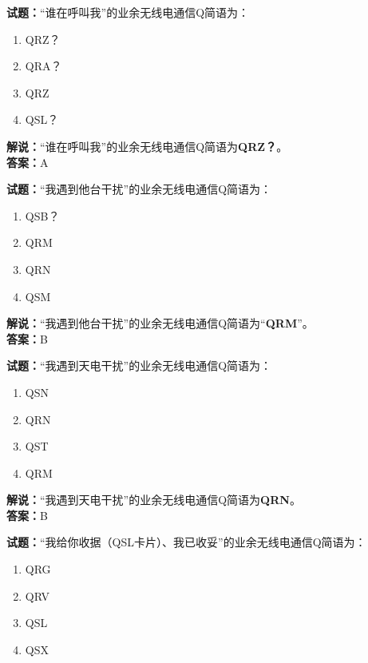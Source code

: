 \documentclass{ctexbook}
\begin{document}
\bigskip


\noindent\textbf{试题：}“谁在呼叫我”的业余无线电通信Q简语为：

\begin{enumerate}[leftmargin=3em]
	\item QRZ？
	\item QRA？
	\item QRZ
	\item QSL？
\end{enumerate}

\noindent\textbf{解说：}“谁在呼叫我”的业余无线电通信Q简语为\textbf{QRZ？}。\\\noindent\textbf{答案：}A


\bigskip


\noindent\textbf{试题：}“我遇到他台干扰”的业余无线电通信Q简语为：

\begin{enumerate}[leftmargin=3em]
	\item QSB？
	\item QRM
	\item QRN
	\item QSM
\end{enumerate}
\noindent\textbf{解说：}“我遇到他台干扰”的业余无线电通信Q简语为“\textbf{QRM}”。\\\noindent\textbf{答案：}B


\bigskip


\noindent\textbf{试题：}“我遇到天电干扰”的业余无线电通信Q简语为：

\begin{enumerate}[leftmargin=3em]
	\item QSN
	\item QRN
	\item QST
	\item QRM
\end{enumerate}

\noindent\textbf{解说：}“我遇到天电干扰”的业余无线电通信Q简语为\textbf{QRN}。\\\noindent\textbf{答案：}B


\bigskip


\noindent\textbf{试题：}“我给你收据（QSL卡片）、我已收妥”的业余无线电通信Q简语为：

\begin{enumerate}[leftmargin=3em]
	\item QRG
	\item QRV
	\item QSL
	\item QSX
\end{enumerate}
\end{document}
